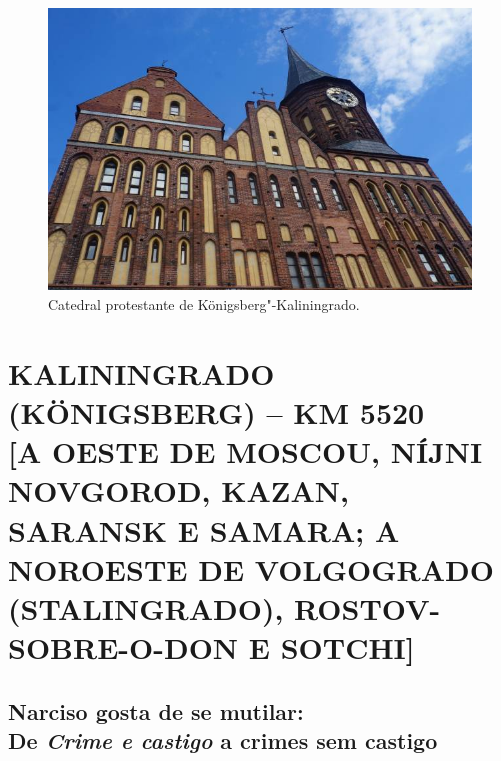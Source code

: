 \begin{absolutelynopagebreak}
\begin{vplace}
\begin{figure}[H]
\begin{adjustwidth}{-2.7cm}{}
  \vspace{2.7cm}
  \hspace{0.5cm}
  \includegraphics[width=140mm]{./imgs/kaliningrado1.jpg}  
\end{adjustwidth}
  \caption{Catedral protestante de Königsberg"-Kaliningrado.}

\thispagestyle{empty}

\end{figure}
\end{vplace}

\end{absolutelynopagebreak}

\clearpage{\pagestyle{empty}\cleardoublepage}
\movetooddpage
{}
\part*{KALININGRADO (KÖNIGSBERG) -- KM 5520\\{[}A OESTE DE MOSCOU, NÍJNI NOVGOROD, KAZAN, SARANSK E SAMARA; A NOROESTE DE VOLGOGRADO (STALINGRADO), ROSTOV-SOBRE-O-DON E SOTCHI{]}}

\chapter*{Narciso gosta de se mutilar:\\De \emph{Crime e castigo} a crimes sem castigo}

